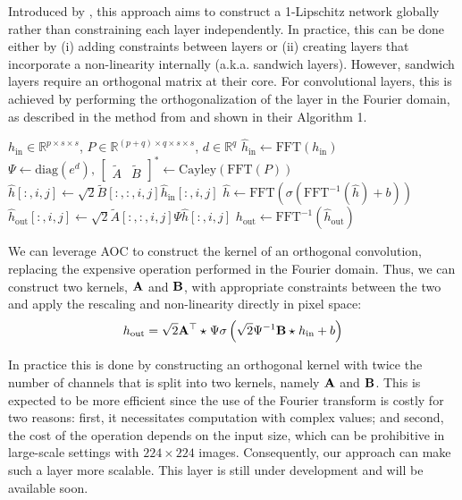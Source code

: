     Introduced by \cite{wang_direct_2023}, this approach aims to construct a 1-Lipschitz network globally rather than constraining each layer independently. In practice, this can be done either by (i) adding constraints between layers or (ii) creating layers that incorporate a non-linearity internally (a.k.a. sandwich layers). However, sandwich layers require an orthogonal matrix at their core. For convolutional layers, this is achieved by performing the orthogonalization of the layer in the Fourier domain, as described in the method from \cite{trockman_orthogonalizing_2021} and shown in their Algorithm 1.
    \begin{algorithm}
        \caption{Sandwich convolutional layer (from \cite{wang_direct_2023})}
        \begin{algorithmic}[1]
            \Require $h_\text{in} \in \mathbb{R}^{p \times s \times s}$, $P \in \mathbb{R}^{(p+q) \times q \times s \times s}$, $d \in \mathbb{R}^q$
            \State $\hat{h}_\text{in} \gets \text{FFT}(h_\text{in})$
            \State $\Psi \gets \text{diag}(e^d), \, \begin{bmatrix} \tilde{A} & \tilde{B} \end{bmatrix}^* \gets \text{Cayley}(\text{FFT}(P))$
            \State $\hat{h}[:, i, j] \gets \sqrt{2} \tilde{B}[:, :, i, j] \hat{h}_\text{in}[:, i, j]$
            \State $\hat{h} \gets \text{FFT}(\sigma(\text{FFT}^{-1}(\hat{h}) + b))$
            \State $\hat{h}_\text{out}[:, i, j] \gets \sqrt{2} \tilde{A}[:, :, i, j] \Psi \hat{h}[:, i, j]$
            \State $h_\text{out} \gets \text{FFT}^{-1}(\hat{h}_\text{out})$
        \end{algorithmic}
    \end{algorithm}

    We can leverage AOC to construct the kernel of an orthogonal convolution, replacing the expensive operation performed in the Fourier domain. Thus, we can construct two kernels, $\mathbf{A}$ and $\mathbf{B}$, with appropriate constraints between the two and apply the rescaling and non-linearity directly in pixel space:
    \[
    h_\text{out} = \sqrt{2} \mathbf{A}^\top \star_{} \Psi \sigma \left( \sqrt{2} \Psi^{-1} \mathbf{B} \star_{} h_\text{in} + b \right)
    \]

    In practice this is done by constructing an orthogonal kernel with twice the number of channels that is split into two kernels, namely $\mathbf{A}$ and $\mathbf{
    B}$. This is expected to be more efficient since the use of the Fourier transform is costly for two reasons: first, it necessitates computation with complex values; and second, the cost of the operation depends on the input size, which can be prohibitive in large-scale settings with $224 \times 224$ images. Consequently, our approach can make such a layer more scalable. This layer is still under development and will be available soon.

